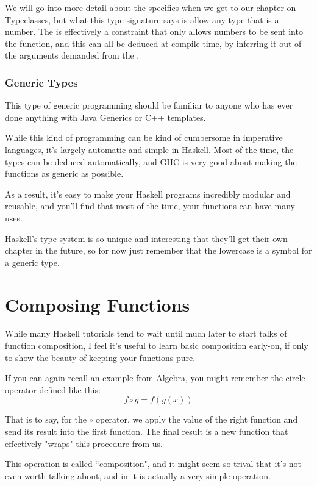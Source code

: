 We will go into more detail about the specifics when we get to our chapter on Typeclasses, but what this type signature says is allow any type  that is a number. The  is effectively a constraint that only allows numbers to be sent into the function, and this can all be deduced at compile-time, by inferring it out of the arguments demanded from the \inlinecode{*}. 

\subsubsection{Generic Types}
This type of generic programming should be familiar to anyone who has ever done anything with Java Generics or C++ templates. 

While this kind of programming can be kind of cumbersome in imperative languages, it's largely automatic and simple in Haskell.  Most of the time, the types can be deduced automatically, and GHC is very good about making the functions as generic as possible.  

As a result, it's easy to make your Haskell programs incredibly modular and reusable, and you'll find that most of the time, your functions can have many uses.  

Haskell's type system is so unique and interesting that they'll get their own chapter in the future, so for now just remember that the lowercase  is a symbol for a generic type. 

\section{Composing Functions}
While many Haskell tutorials tend to wait until much later to start talks of function composition, I feel it's useful to learn basic composition early-on, if only to show the beauty of keeping your functions pure. 

If you can again recall an example from Algebra, you might remember the circle operator defined like this: 
$$
f \circ g = f\left(g\left(x\right)\right)
$$

That is to say, for the $\circ$ operator, we apply the value of the right function and send its result into the first function. The final result is a new function that effectively "wraps" this procedure from us. 

This operation is called ``composition", and it might seem so trival that it's not even worth talking about, and in it is actually a very simple operation. 

